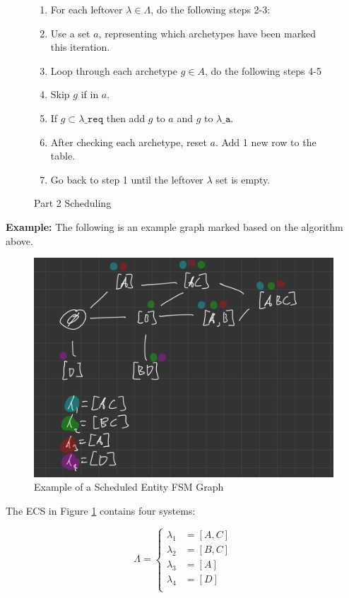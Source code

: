 \begin{figure}[H]
    \begin{enumerate}
        \item For each leftover $\lambda \in \Lambda$, do the following steps 2-3:
        \item Use a set $a$, representing which archetypes have been marked this iteration.
        \item Loop through each archetype $g \in A$, do the following steps 4-5
        \item Skip $g$ if in $a$.
        \item If $g \subset \lambda\_{\texttt{req}}$ then add $g$ to $a$ and $g$ to $\lambda\_{\texttt{a}}$.
        \item After checking each archetype, reset $a$. Add 1 new row to the table.
        \item Go back to step 1 until the leftover $\lambda$ set is empty.
    \end{enumerate}
    \caption{Part 2 Scheduling}
\end{figure}

\textbf{Example:} The following is an example graph marked based on the algorithm above.

\begin{figure}[H]
    \centering
    \includegraphics[width=0.5\linewidth]{resources/graph2.png}
    \caption{Example of a Scheduled Entity FSM Graph}
    \label{fig:graph2}
\end{figure}

The ECS in Figure \ref{fig:graph2} contains four systems: 

\begin{equation*}
    \Lambda = \begin{cases}
        \lambda_1 &= [A,C] \\
        \lambda_2 &= [B,C] \\ 
        \lambda_3 &= [A] \\ 
        \lambda_4 &= [D] \\ 
    \end{cases}
\end{equation*}

